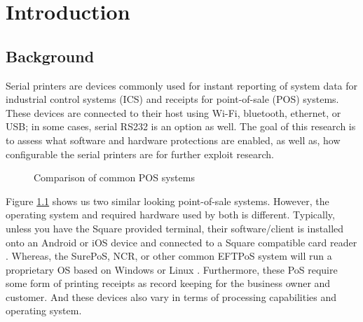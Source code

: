 \chapter{\leavevmode Introduction}
\label{chap:introduction}

\section{Background}  \label{background}

Serial printers are devices commonly used for instant reporting of system data for industrial control systems (ICS) and receipts for point-of-sale (POS) systems. These devices are connected to their host using Wi-Fi, bluetooth, ethernet, or USB; in some cases, serial RS232 is an option as well. The goal of this research is to assess what software and hardware protections are enabled, as well as, how configurable the serial printers are for further exploit research.


\begin{figure}[ht]%
  \centering
  \qquad
  \caption{Comparison of common POS systems}%
  \label{fig:comparison_pos}%
\end{figure}

Figure \ref{fig:comparison_pos} shows us two similar looking point-of-sale systems. However, the operating system and required hardware used by both is different. Typically, unless you have the Square provided terminal, their software/client is installed onto an Android or iOS device and connected to a Square compatible card reader \autocite{ondrusMobilePaymentsMarket2011}. Whereas, the SurePoS, NCR, or other common EFTPoS system will run a proprietary OS based on Windows or Linux \autocite{ebimoboweiROLESOFTWARECASHLESS2018}. Furthermore, these PoS require some form of printing receipts as record keeping for the business owner and customer. And these devices also vary in terms of processing capabilities and operating system.

